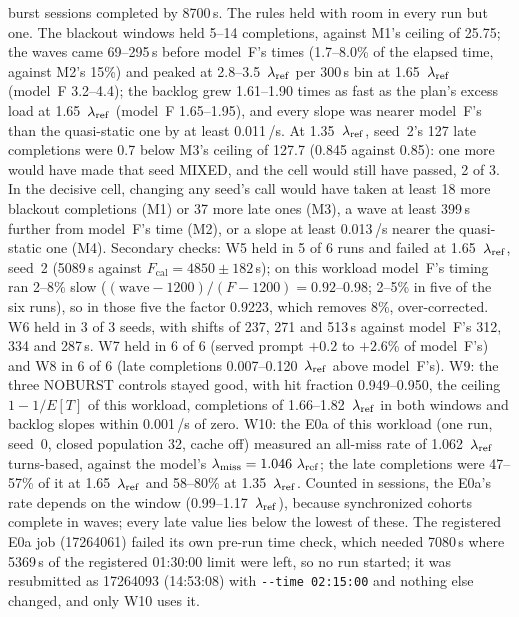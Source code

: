 burst sessions completed by 8700\,s. The rules held with room in every run but one. The blackout windows held 5--14 completions, against M1's ceiling of 25.75;
the waves came 69--295\,s before model~F's times (1.7--8.0\% of the elapsed time, against M2's 15\%) and peaked at 2.8--3.5~$\lambda_{\mathrm{ref}}$
per 300\,s bin at 1.65~$\lambda_{\mathrm{ref}}$ (model~F 3.2--4.4); the backlog grew 1.61--1.90 times as fast as the plan's excess load at
1.65~$\lambda_{\mathrm{ref}}$ (model~F 1.65--1.95), and every slope was nearer model~F's than the quasi-static one by at least 0.011\,/s. At
1.35~$\lambda_{\mathrm{ref}}$, seed~2's 127 late completions were 0.7 below M3's ceiling of 127.7 (0.845 against 0.85): one more would have made that
seed MIXED, and the cell would still have passed, 2 of 3. In the decisive cell, changing any seed's call would have taken at
least 18 more blackout completions (M1) or 37 more late ones (M3), a wave at least 399\,s further from model~F's time (M2), or a
slope at least 0.013\,/s nearer the quasi-static one (M4). Secondary checks: W5 held in 5 of 6 runs and failed at 1.65~$\lambda_{\mathrm{ref}}$,
seed~2 (5089\,s against $F_{\mathrm{cal}}=4850\pm182$\,s); on this workload model~F's timing ran 2--8\% slow
($(\text{wave}-1200)/(F-1200)=0.92$--0.98; 2--5\% in five of the six runs), so in those five the factor 0.9223, which removes 8\%, over-corrected. W6 held in 3 of 3 seeds, with shifts of
237, 271 and 513\,s against model~F's 312, 334 and 287\,s. W7 held in 6 of 6 (served prompt $+0.2$ to $+2.6$\% of model~F's) and W8
in 6 of 6 (late completions 0.007--0.120~$\lambda_{\mathrm{ref}}$ above model~F's). W9: the three NOBURST controls stayed good, with hit fraction
0.949--0.950, the ceiling $1-1/E[T]$ of this workload, completions of 1.66--1.82~$\lambda_{\mathrm{ref}}$ in both windows and backlog slopes within
0.001\,/s of zero. W10: the E0a of this workload (one run, seed~0, closed population 32, cache off) measured an all-miss rate of
1.062~$\lambda_{\mathrm{ref}}$ turns-based, against the model's $\lambda_{\mathrm{miss}}=1.046~\lambda_{\mathrm{ref}}$; the late completions were 47--57\% of it at 1.65~$\lambda_{\mathrm{ref}}$
and 58--80\% at 1.35~$\lambda_{\mathrm{ref}}$. Counted in sessions, the E0a's rate depends on the window (0.99--1.17~$\lambda_{\mathrm{ref}}$), because synchronized
cohorts complete in waves; every late value lies below the lowest of these. The registered E0a job (17264061) failed its own
pre-run time check, which needed 7080\,s where 5369\,s of the registered 01:30:00 limit were left, so no run started; it was
resubmitted as 17264093 (14:53:08) with \texttt{-{}-time 02:15:00} and nothing else changed, and only W10 uses it.

